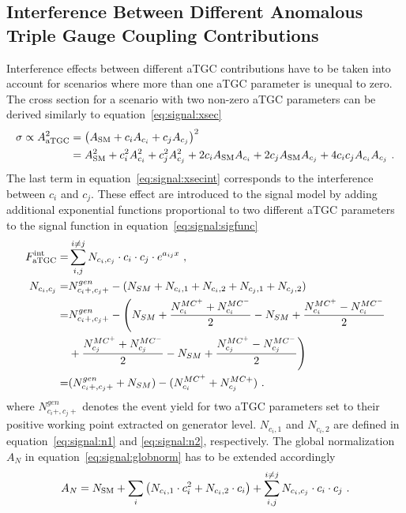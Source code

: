 \subsection{Interference Between Different Anomalous Triple Gauge Coupling Contributions}
\label{subsec:signal:aTGCInt}
Interference effects between different aTGC contributions have to be taken into account for scenarios where more than one aTGC parameter is unequal to zero. The cross section for a scenario with two non-zero aTGC parameters can be derived similarly to equation~\ref{eq:signal:xsec}
\begin{align}
\sigma \propto A_{\rm aTGC}^2 &= \left( A_{\rm SM} + c_i A_{c_i} + c_j A_{c_j} \right)^2 \\
&= A_{\rm SM}^2 + c_i^2 A_{c_i}^2 + c_j^2 A_{c_j}^2 + 2c_i A_{\rm SM} A_{c_i} + 2c_j A_{\rm SM} A_{c_j} + 4c_ic_jA_{c_i}A_{c_j} ~. \label{eq:signal:xsecint}
\end{align}
The last term in equation~\ref{eq:signal:xsecint} corresponds to the interference between $c_i$ and $c_j$. These effect are introduced to the signal model by adding additional exponential functions proportional to two different aTGC parameters to the signal function in equation~\ref{eq:signal:sigfunc}
\begin{align}
F_{\rm aTGC}^{\rm int} =& \sum_{i,j}^{i \neq j} N_{c_i,c_j} \cdot c_i \cdot c_j \cdot e^{a_{ij}x} ~, \\
N_{c_i,c_j} =& N_{c_i+,c_j+}^{gen} - (N_{SM} + N_{c_i,1} + N_{c_i,2} + N_{c_j,1} + N_{c_j,2}) \\ 
	=& N_{c_i+,c_j+}^{gen} - \Bigg(N_{SM} + \frac{N_{c_i}^{MC^+}+N_{c_i}^{MC^-}}{2}-N_{SM} + \frac{N_{c_i}^{MC^+}-N_{c_i}^{MC^-}}{2} \\ 
	&+ \frac{N_{c_j}^{MC^+}+N_{c_j}^{MC^-}}{2}-N_{SM} + \frac{N_{c_j}^{MC^+}-N_{c_j}^{MC^-}}{2} \Bigg) \nonumber \\ 
	=&(N_{c_i+,c_j+}^{gen}+N_{SM})-(N_{c_i}^{MC^+}+N_{c_j}^{MC+}) ~. 
\end{align}
where $N_{c_i+,c_j+}^{gen}$ denotes the event yield for two aTGC parameters set to their positive working point extracted on generator level. $N_{c_i,1}$ and $N_{c_i,2}$ are defined in equation~\ref{eq:signal:n1} and \ref{eq:signal:n2}, respectively. The global normalization $A_N$ in equation~\ref{eq:signal:globnorm} has to be extended accordingly
\begin{equation}
A_N = N_{\rm SM} + \sum_i \left( N_{c_i,1}\cdot c_i^2 + N_{c_i,2}\cdot c_i \right) + \sum_{i,j}^{i \neq j} N_{c_i,c_j} \cdot c_i \cdot c_j ~. 
\end{equation}
